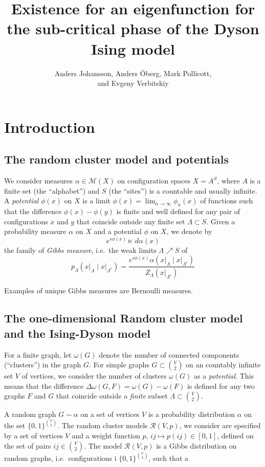 \documentclass[11pt, a4paper, oneside]{article}
\title{Existence for an eigenfunction for the sub-critical phase of the Dyson
  Ising model}
\author{Anders Johansson, Anders \"Oberg, Mark Pollicott, \\ and Evgeny Verbitskiy}
\date{}
\theoremstyle{definition}
\theoremstyle{remark}
\renewcommand{\d}{\,d}
\providecommand{\mscr}{\mathscr}
\providecommand{\w}{\omega}
\begin{document}
\maketitle


\section{Introduction}\noindent


\def\gibb{\dot\ltimes} \def\gibbs{\ltimes}

\subsection{The random cluster model and potentials}

We consider measures $\alpha \in \mscr M(X)$ on configuration spaces $X = A^S$,
where $A$ is a finite set (the ``alphabet'') and $S$ (the ``sites'') is a
countable and usually infinite. A \emph{potential} $\phi(x)$ on $X$ is a limit
$\phi(x) = \lim_{n\to\infty}\phi_n(x)$ of functions such that the difference
$\phi(x)-\phi(y)$ is finite and well defined for any pair of configurations $x$
and $y$ that coincide outside any finite set $\Lambda\subset S$. Given a
probability measure $\alpha$ on $X$ and a potential $\phi$ on $X$, we denote by
\[
  e^{s\phi(x)} \gibbs \d\alpha(x)
\]
the family of \emph{Gibbs measure}, i.e.\ the weak limits $\Lambda\nearrow S$ of
\[
  p_\Lambda(x\vert_\Lambda\mid x\vert_{\Lambda^c}) = \frac {e^{s\phi(x)}\alpha(x\vert_{\Lambda}\mid x\vert_{\Lambda^c})} {Z_\Lambda(x\vert_{\Lambda^c})}
\]

Examples of unique Gibbs measures are Bernoulli measures.

\subsection{The one-dimensional Random cluster model and the Ising-Dyson model}

For a finite graph, let $\w(G)$ denote the number of connected components
(``clusters'') in the graph $G$. For simple graphs $G\subset \binom V2$ on an
countably infinite set $V$ of vertices, we consider the number of clusters
$\w(G)$ as a \emph{potential}. This means that the difference
$\Delta\w(G,F) = \w(G)-\w(F)$ is defined for any two graphs $F$ and $G$ that
coincide outside a \emph{finite} subset $\Lambda\subset \binom V2$.

A random graph $G\sim\alpha$ on a set of vertices $V$ is a probability
distribution $\alpha$ on the set $\{0,1\}^{\binom V2}$. The random cluster
models $\mscr R(V,p)$, we consider are specified by a set of vertices $V$ and a
weight function $p$, $ij\mapsto p(ij)\in[0,1]$, defined on the set of pairs
$ij\in \binom V2$. The model $\mscr R(V,p)$ is a Gibbs distribution on random
graphs, i.e.\ configurations i $\{0,1\}^{\binom V2}$, such that a
\end{document}
